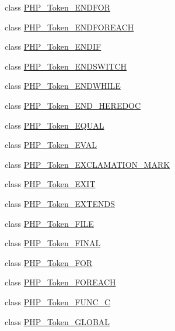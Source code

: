\begin{DoxyCompactItemize}
\item 
class \mbox{\hyperlink{class_p_h_p___token___e_n_d_f_o_r}{P\+H\+P\+\_\+\+Token\+\_\+\+E\+N\+D\+F\+OR}}
\item 
class \mbox{\hyperlink{class_p_h_p___token___e_n_d_f_o_r_e_a_c_h}{P\+H\+P\+\_\+\+Token\+\_\+\+E\+N\+D\+F\+O\+R\+E\+A\+CH}}
\item 
class \mbox{\hyperlink{class_p_h_p___token___e_n_d_i_f}{P\+H\+P\+\_\+\+Token\+\_\+\+E\+N\+D\+IF}}
\item 
class \mbox{\hyperlink{class_p_h_p___token___e_n_d_s_w_i_t_c_h}{P\+H\+P\+\_\+\+Token\+\_\+\+E\+N\+D\+S\+W\+I\+T\+CH}}
\item 
class \mbox{\hyperlink{class_p_h_p___token___e_n_d_w_h_i_l_e}{P\+H\+P\+\_\+\+Token\+\_\+\+E\+N\+D\+W\+H\+I\+LE}}
\item 
class \mbox{\hyperlink{class_p_h_p___token___e_n_d___h_e_r_e_d_o_c}{P\+H\+P\+\_\+\+Token\+\_\+\+E\+N\+D\+\_\+\+H\+E\+R\+E\+D\+OC}}
\item 
class \mbox{\hyperlink{class_p_h_p___token___e_q_u_a_l}{P\+H\+P\+\_\+\+Token\+\_\+\+E\+Q\+U\+AL}}
\item 
class \mbox{\hyperlink{class_p_h_p___token___e_v_a_l}{P\+H\+P\+\_\+\+Token\+\_\+\+E\+V\+AL}}
\item 
class \mbox{\hyperlink{class_p_h_p___token___e_x_c_l_a_m_a_t_i_o_n___m_a_r_k}{P\+H\+P\+\_\+\+Token\+\_\+\+E\+X\+C\+L\+A\+M\+A\+T\+I\+O\+N\+\_\+\+M\+A\+RK}}
\item 
class \mbox{\hyperlink{class_p_h_p___token___e_x_i_t}{P\+H\+P\+\_\+\+Token\+\_\+\+E\+X\+IT}}
\item 
class \mbox{\hyperlink{class_p_h_p___token___e_x_t_e_n_d_s}{P\+H\+P\+\_\+\+Token\+\_\+\+E\+X\+T\+E\+N\+DS}}
\item 
class \mbox{\hyperlink{class_p_h_p___token___f_i_l_e}{P\+H\+P\+\_\+\+Token\+\_\+\+F\+I\+LE}}
\item 
class \mbox{\hyperlink{class_p_h_p___token___f_i_n_a_l}{P\+H\+P\+\_\+\+Token\+\_\+\+F\+I\+N\+AL}}
\item 
class \mbox{\hyperlink{class_p_h_p___token___f_o_r}{P\+H\+P\+\_\+\+Token\+\_\+\+F\+OR}}
\item 
class \mbox{\hyperlink{class_p_h_p___token___f_o_r_e_a_c_h}{P\+H\+P\+\_\+\+Token\+\_\+\+F\+O\+R\+E\+A\+CH}}
\item 
class \mbox{\hyperlink{class_p_h_p___token___f_u_n_c___c}{P\+H\+P\+\_\+\+Token\+\_\+\+F\+U\+N\+C\+\_\+C}}
\item 
class \mbox{\hyperlink{class_p_h_p___token___g_l_o_b_a_l}{P\+H\+P\+\_\+\+Token\+\_\+\+G\+L\+O\+B\+AL}}

\end{DoxyCompactItemize}
